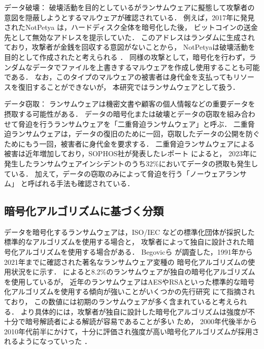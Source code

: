 データ破壊：
破壊活動を目的としているがランサムウェアに擬態して攻撃者の意図を隠蔽しようとするマルウェアが確認されている．
例えば，2017年に発見されたNotPetya \cite{Petya-No22:online} は，ハードディスク全体を暗号化した後，
ビットコインの送金先として無効なアドレスを提示していた．
このアドレスはランダムに生成されており，攻撃者が金銭を回収する意図がないことから，
NotPetyaは破壊活動を目的として作成されたと考えられる \cite{Petya-No22:online}．
同様の攻撃として，暗号化を行わず，ランダムなデータでファイルを上書きするマルウェアを作成し使用することも可能である．
なお，このタイプのマルウェアの被害者は身代金を支払ってもリソースを復旧することができないが，
本研究ではランサムウェアとして扱う．

データ窃取：
ランサムウェアは機密文書や顧客の個人情報などの重要データを摂取する可能性がある．
データの暗号化または破壊とデータの窃取を組み合わせて脅迫を行うランサムウェアを「二重脅迫ランサムウェア」と呼ぶ．
二重脅迫ランサムウェアは，データの復旧のために一回，窃取したデータの公開を防ぐためにもう一回，被害者に身代金を要求する．
二重脅迫ランサムウェアによる被害は近年増加しており，SOPHOS社が発表したレポート \cite{sophos-report:online} によると，
2023年に発生したランサムウェアインシデントのうち32\%においてデータの摂取も発生している．
加えて，データの窃取のみによって脅迫を行う「ノーウェアランサム」\cite{nowhere-ransom} と呼ばれる手法も確認されている．

\subsection{暗号化アルゴリズムに基づく分類}
\label{subsec:encrypt-algo}
データを暗号化するランサムウェアは，ISO/IEC \cite{ISOIEC2784:online} などの標準化団体が採択した標準的なアルゴリズムを使用する場合と，
攻撃者によって独自に設計された暗号化アルゴリズムを使用する場合がある．
Begovicら \cite{begovic2023cryptographic} が調査した，1991年から2021年までに確認された著名なランサムウェア変種の
暗号化アルゴリズムの使用状況をに示す．
によると8.2\%のランサムウェアが独自の暗号化アルゴリズムを使用しているが，
近年のランサムウェアはAESやRSAといった標準的な暗号化アルゴリズムを使用する傾向が強いことがいくつかの先行研究 \cite{Evolution-Ransomware,key-management}にて指摘されており，
この数値には初期のランサムウェアが多く含まれていると考えられる．
より具体的には，攻撃者が独自に設計した暗号化アルゴリズムは強度が不十分で暗号解読者による解読が容易であることが多い \cite{key-management}ため，
2000年代後半から2010年代前半にかけて，十分に評価され強度が高い暗号化アルゴリズムが採用されるようになっていった \cite{Evolution-Ransomware}．

